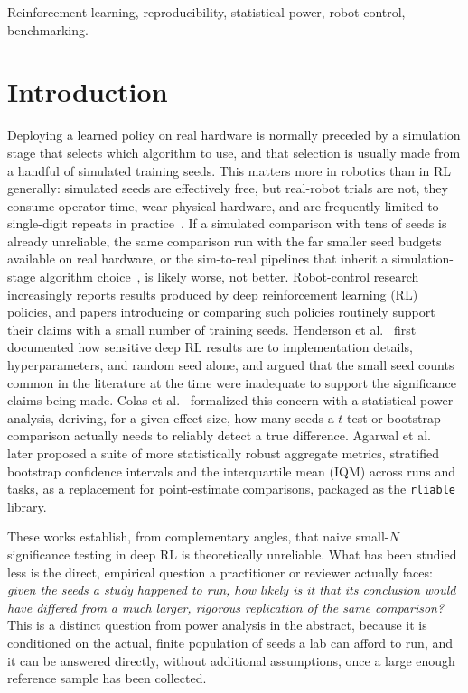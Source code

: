\documentclass[journal]{IEEEtran}
\begin{document}
\begin{IEEEkeywords}
Reinforcement learning, reproducibility, statistical power, robot control, benchmarking.
\end{IEEEkeywords}

\section{Introduction}

Deploying a learned policy on real hardware is normally preceded by a simulation stage that
selects which algorithm to use, and that selection is usually made from a handful of simulated
training seeds. This matters more in robotics than in RL generally: simulated seeds are
effectively free, but real-robot trials are not, they consume operator time, wear physical
hardware, and are frequently limited to single-digit repeats in
practice~\cite{mahmood2018benchmarking,dulac2021challenges}. If a simulated comparison with tens
of seeds is already unreliable, the same comparison run with the far smaller seed budgets
available on real hardware, or the sim-to-real pipelines that inherit a simulation-stage algorithm
choice~\cite{zhao2020simtoreal}, is likely worse, not better. Robot-control research increasingly
reports results produced by deep reinforcement learning (RL) policies, and papers introducing or
comparing such policies routinely support their claims with a small number of training seeds.
Henderson et al.~\cite{henderson2018deep} first documented how
sensitive deep RL results are to implementation details, hyperparameters, and random seed alone,
and argued that the small seed counts common in the literature at the time were inadequate to
support the significance claims being made. Colas et al.~\cite{colas2018many} formalized this
concern with a statistical power analysis, deriving, for a given effect size, how many seeds a
$t$-test or bootstrap comparison actually needs to reliably detect a true difference. Agarwal et
al.~\cite{agarwal2021deep} later proposed a suite of more statistically robust aggregate metrics,
stratified bootstrap confidence intervals and the interquartile mean (IQM) across runs and tasks,
as a replacement for point-estimate comparisons, packaged as the \texttt{rliable} library.

These works establish, from complementary angles, that naive small-$N$ significance testing in
deep RL is theoretically unreliable. What has been studied less is the direct, empirical question
a practitioner or reviewer actually faces: \emph{given the seeds a study happened to run, how
likely is it that its conclusion would have differed from a much larger, rigorous replication
of the same comparison?} This is a distinct question from power analysis in the abstract, because
it is conditioned on the actual, finite population of seeds a lab can afford to run, and it can be
answered directly, without additional assumptions, once a large enough reference sample has been
collected.
\end{document}
